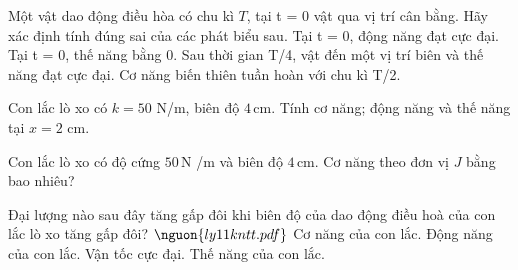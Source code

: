 \begin{ex}
Một vật dao động điều hòa có chu kì $T$, tại t = 0 vật qua vị trí cân bằng. Hãy xác định tính đúng sai của các phát biểu sau.
\choiceTF
{\True Tại t = 0, động năng đạt cực đại.}
{\True Tại t = 0, thế năng bằng 0.}
{\True Sau thời gian T/4, vật đến một vị trí biên và thế năng đạt cực đại.}
{Cơ năng biến thiên tuần hoàn với chu kì T/2.}
\end{ex}

\begin{bt}
Con lắc lò xo có $k=50$ N/m, biên độ $4\,\text{cm}$. Tính cơ năng; động năng và thế năng tại $x=2$ cm.
\end{bt}

\begin{ex}
Con lắc lò xo có độ cứng $50\,\text{N}$ /m và biên độ $4\,\text{cm}$. Cơ năng theo đơn vị $J$ bằng bao nhiêu?
\end{ex}

\begin{ex}
Đại lượng nào sau đây tăng gấp đôi khi biên độ của dao động điều hoà của con lắc lò xo tăng gấp đôi? $\nguon{ly11 kntt.pdf}$
\choice
{Cơ năng của con lắc.}
{Động năng của con lắc.}
{\True Vận tốc cực đại.}
{Thế năng của con lắc.}
\end{ex}

